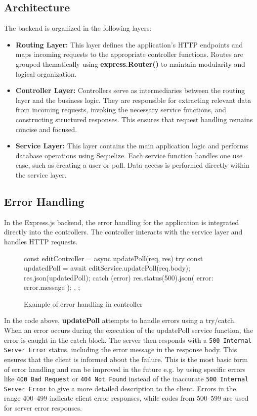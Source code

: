 \documentclass[a4paper,12pt]{report}
\begin{document}
\subsection{Architecture}
The backend is organized in the following layers:
\begin{itemize}
	\item \textbf{Routing Layer:} This layer defines the application's HTTP endpoints and maps incoming requests to the appropriate controller functions. Routes are grouped thematically using \textbf{express.Router()} to maintain modularity and logical organization.
	
	\item \textbf{Controller Layer:} Controllers serve as intermediaries between the routing layer and the business logic. They are responsible for extracting relevant data from incoming requests, invoking the necessary service functions, and constructing structured responses. This ensures that request handling remains concise and focused.
	
	\item \textbf{Service Layer:} This layer contains the main application logic and performs database operations using Sequelize. Each service function handles one use case, such as creating a user or poll. Data access is performed directly within the service layer. \\
\end{itemize}
\subsection{Error Handling}
In the Express.js backend, the error handling for the application is integrated directly into the controllers. The controller interacts with the service layer and handles HTTP requests. 
\begin{figure}[H]
	\begin{code}
		const editController = {
			async updatePoll(req, res) {
				try {
					const updatedPoll = await editService.updatePoll(req.body);
					res.json(updatedPoll);
				} catch (error) {
					res.status(500).json({ error: error.message });
				}
			},
		};
	\end{code}
	\caption{Example of error handling in controller}
	\label{fig:controller-err}
\end{figure}
\noindent
In the code above, \textbf{updatePoll} attempts to handle errors using a try/catch. When an error occurs during the execution of the updatePoll service function, the error is caught in the catch block. The server then responds with a \texttt{500 Internal Server Error} status, including the error message in the response body. This ensures that the client is informed about the failure. This is the most basic form of error handling and can be improved in the future e.g. by using specific errors like \texttt{400 Bad Request} or \texttt{404 Not Found} instead of the inaccurate \texttt{500 Internal Server Error} to give a more detailed description to the client. Errors in the range 400–499 indicate client error responses, while codes from 500–599 are used for server error responses. \cite{http-status-codes} \\
\end{document}
